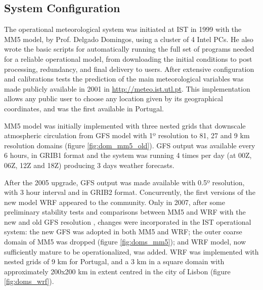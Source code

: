 


\subsection{System Configuration} 
\label{sec:meteo_ist}

The operational meteorological system was initiated at IST in 1999 with the MM5 model, by Prof. Delgado Domingos, using a cluster of 4 Intel PCs. He also wrote the basic scripts for automatically running the full set of programs needed for a reliable operational model, from downloading the initial conditions to post processing, redundancy, and final delivery to users. After extensive configuration and calibrations tests \citep{Sousa2002} the prediction of the main meteorological variables was made publicly available in 2001 in \url{http://meteo.ist.utl.pt}. This implementation allows any public user to choose any location given by its geographical coordinates, and was the first available in Portugal.

MM5 model was initially implemented with three nested grids that downscale atmospheric circulation from GFS model with 1º resolution to 81, 27 and 9 km resolution domains (figure \ref{fig:dom_mm5_old}). GFS output was available every 6 hours, in GRIB1 format and the system was running 4 times per day (at 00Z, 06Z, 12Z and 18Z) producing 3 days weather forecasts.

After the 2005 upgrade, GFS output was made available with 0.5º resolution, with 3 hour interval and in GRIB2 format. Concurrently, the first versions of the new model WRF appeared to the community. Only in 2007, after some preliminary stability tests and comparisons between MM5 and WRF with the new and old GFS resolution \citep{EMS2007}, changes were incorporated in the IST operational system: the new GFS was adopted in both MM5 and WRF; the outer coarse domain of MM5 was dropped (figure \ref{fig:doms_mm5}); and WRF model, now sufficiently mature to be operationalized, was added. WRF was implemented with nested grids of 9 km for Portugal, and a 3 km in a square domain with approximately 200x200 km in extent centred in the city of Lisbon (figure \ref{fig:doms_wrf}). 

